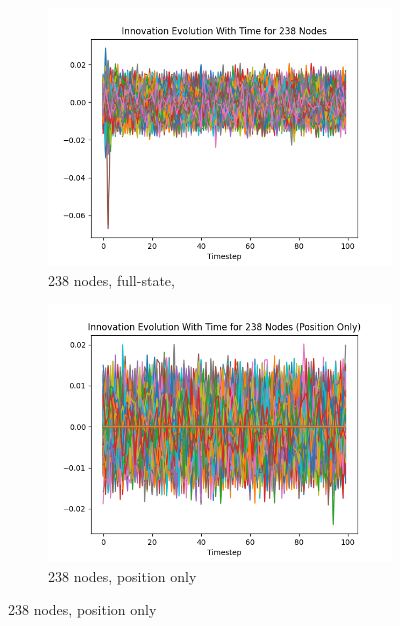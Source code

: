 \begin{figure}[ht]
    \centering
    \begin{subfigure}[b]{0.32\linewidth}
        \includegraphics[width=\linewidth]{CLOTH REPORT PICS/innovation 238.jpg}
        \caption{238 nodes, full-state,}
        \label{fig:innovation-238-full}
    \end{subfigure}
    \hfill %
    \begin{subfigure}[b]{0.32\linewidth}
        \includegraphics[width=\linewidth]{CLOTH REPORT PICS/innovation 238p.jpg}
        \caption{238 nodes, position only}
        \label{fig:innovation-238-pos}
    \end{subfigure}

\end{figure}
